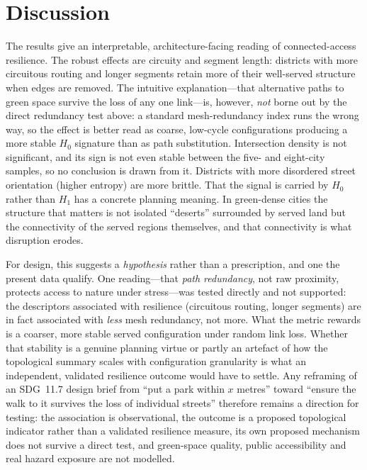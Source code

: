 \documentclass[sn-mathphys-num,pdflatex]{sn-jnl}
\begin{document}
\section{Discussion}
The results give an interpretable, architecture-facing reading of connected-access
resilience.
The robust effects are circuity and segment length: districts with more circuitous
routing and longer segments retain more of their well-served structure when edges
are removed. The intuitive explanation---that alternative paths to green space survive
the loss of any one link---is, however, \emph{not} borne out by the direct redundancy
test above: a standard mesh-redundancy index runs the wrong way, so the effect is
better read as coarse, low-cycle configurations producing a more stable $H_0$
signature than as path substitution. Intersection density is not significant, and its
sign is not even stable
between the five- and eight-city samples, so no conclusion is drawn from it. Districts
with more disordered street orientation (higher entropy) are more brittle. That the signal
is carried by $H_0$ rather than $H_1$ has a concrete planning meaning. In
green-dense cities the structure that matters is not isolated ``deserts''
surrounded by served land but the connectivity of the served regions themselves,
and that connectivity is what disruption erodes.

For design, this suggests a \emph{hypothesis} rather than a prescription, and one the
present data qualify. One reading---that \emph{path redundancy}, not raw
proximity, protects access to nature under stress---was tested directly and not
supported: the descriptors associated with resilience (circuitous routing, longer
segments) are in fact associated with \emph{less} mesh redundancy, not more. What the
metric rewards is a coarser, more stable served configuration under random link loss.
Whether that stability is a genuine planning virtue or partly an artefact of how the
topological summary scales with configuration granularity is what an
independent, validated resilience outcome would have to settle. Any reframing of an
SDG~11.7 design brief from ``put a park within $x$ metres'' toward ``ensure the walk
to it survives the loss of individual streets'' therefore remains a direction for
testing: the association is observational, the outcome is a proposed topological
indicator rather than a validated resilience measure, its own proposed mechanism does
not survive a direct test, and green-space quality, public accessibility and real
hazard exposure are not modelled.
\end{document}
